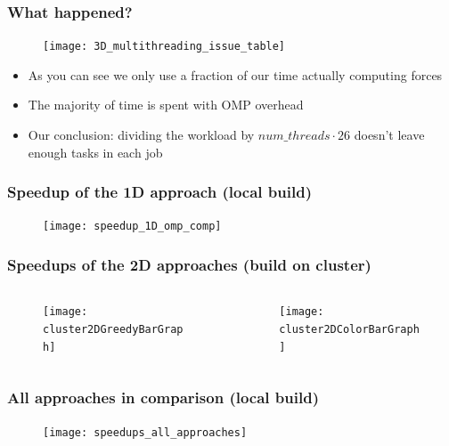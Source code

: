 \begin{frame}
	\frametitle{What happened?}
	\begin{figure}
		\centering
		\texttt{[image: 3D\_multithreading\_issue\_table]}
		\label{fig:3dmultithreadingissuetable}
	\end{figure}
	\large
\begin{itemize}
	\setlength\itemsep{1em}
	\item As you can see we only use a fraction of our time actually computing forces
	\item The majority of time is spent with OMP overhead
	\item Our conclusion: dividing the workload by $num\_threads\cdot26$ doesn't leave enough tasks in each job	
\end{itemize}
\end{frame}

\begin{frame}
	\frametitle{Speedup of the 1D approach (local build)}
	\begin{figure}
		\centering
		\texttt{[image: speedup\_1D\_omp\_comp]}
		\label{fig:speedup1dompcomp}
	\end{figure}
	
\end{frame}

\begin{frame}
	\frametitle{Speedups of the 2D approaches (build on cluster)}
	\begin{columns}
		
	\begin{column}{0.5\linewidth}
		\begin{figure}
			\centering
			\texttt{[image: cluster2DGreedyBarGraph]}
			\label{fig:cluster2dgreedybargraph}
		\end{figure}
		
	\end{column}
	
	\begin{column}{0.5\linewidth}
		\begin{figure}
			\centering
			\texttt{[image: cluster2DColorBarGraph]}
			\label{fig:cluster2dcolorbargraph}
		\end{figure}
	\end{column}
	\end{columns}	
\end{frame}

\begin{frame}
	\frametitle{All approaches in comparison (local build)}
	
	\begin{figure}
		\centering
		\texttt{[image: speedups\_all\_approaches]}
		\label{fig:speedupsallapproaches}
	\end{figure}
	
	
\end{frame}

